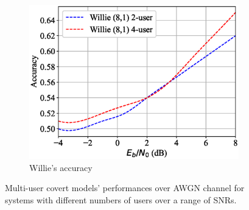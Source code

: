 \begin{figure}[tp!]
\begin{subfigure}{0.28\textwidth}
		\includegraphics[width=\linewidth]{figs/multi_willie_accuracy_awgn}
		\caption{Willie's accuracy}	
		\label{fig:multi_awgn_results_willie}
	\end{subfigure}
	\caption{Multi-user covert models' performances over AWGN channel for systems with different numbers of users over a range of SNRs.}
	\label{fig:multi_awgn_results}
\end{figure}

